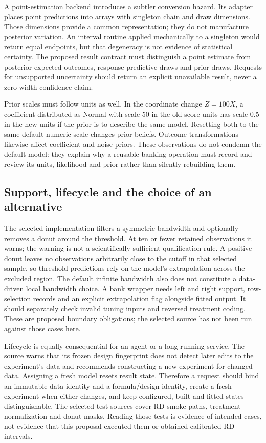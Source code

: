 A point-estimation backend introduces a subtler conversion hazard. Its adapter
places point predictions into arrays with singleton chain and draw dimensions.
Those dimensions provide a common representation; they do not manufacture
posterior variation. An interval routine applied mechanically to a singleton
would return equal endpoints, but that degeneracy is not evidence of statistical
certainty. The proposed result contract must distinguish a point estimate from
posterior expected outcomes, response-predictive draws and prior draws. Requests
for unsupported uncertainty should return an explicit unavailable result, never
a zero-width confidence claim.\citep{exec14_causalpy_primary,exec14_causalpy_decision}

Prior scales must follow units as well. In the coordinate change $Z=100X$, a
coefficient distributed as Normal with scale 50 in the old score units has scale
0.5 in the new units if the prior is to describe the same model. Resetting both
to the same default numeric scale changes prior beliefs. Outcome transformations
likewise affect coefficient and noise priors. These observations do not condemn
the default model: they explain why a reusable banking operation must record and
review its units, likelihood and prior rather than silently rebuilding them.
\citep{exec14_causalpy_primary,exec14_causalpy_exact}

\subsection{Support, lifecycle and the choice of an alternative}

The selected implementation filters a symmetric bandwidth and optionally removes
a donut around the threshold. At ten or fewer retained observations it warns;
the warning is not a scientifically sufficient qualification rule. A positive
donut leaves no observations arbitrarily close to the cutoff in that selected
sample, so threshold predictions rely on the model's extrapolation across the
excluded region. The default infinite bandwidth also does not constitute a
data-driven local bandwidth choice. A bank wrapper needs left and right support,
row-selection records and an explicit extrapolation flag alongside fitted output.
It should separately check invalid tuning inputs and reversed treatment coding.
These are proposed boundary obligations; the selected source has not been run
against those cases here.\citep{exec14_causalpy_primary,exec14_causalpy_decision}

Lifecycle is equally consequential for an agent or a long-running service. The
source warns that its frozen design fingerprint does not detect later edits to
the experiment's data and recommends constructing a new experiment for changed
data. Assigning a fresh model resets result state. Therefore a request should bind
an immutable data identity and a formula/design identity, create a fresh experiment
when either changes, and keep configured, built and fitted states distinguishable.
The selected test sources cover RD smoke paths, treatment normalization and donut
masks. Reading those tests is evidence of intended cases, not evidence that this
proposal executed them or obtained calibrated RD intervals.
\citep{exec14_causalpy_primary}

